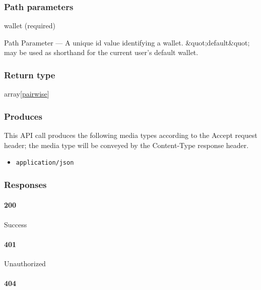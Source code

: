 \hypertarget{path-parameters-70}{%
\subsubsection{Path parameters}\label{path-parameters-70}}

wallet (required)

{Path Parameter} --- A unique id value identifying a wallet.
\&quot;default\&quot; may be used as shorthand for the current user's
default wallet.

\hypertarget{return-type-102}{%
\subsubsection{Return type}\label{return-type-102}}

array{[}\protect\hyperlink{pairwise}{pairwise}{]}

\hypertarget{produces-131}{%
\subsubsection{Produces}\label{produces-131}}

This API call produces the following media types according to the
{Accept} request header; the media type will be conveyed by the
{Content-Type} response header.

\begin{itemize}
\tightlist
\item
  \texttt{application/json}
\end{itemize}

\hypertarget{responses-134}{%
\subsubsection{Responses}\label{responses-134}}

\hypertarget{section-438}{%
\paragraph{200}\label{section-438}}

Success

\hypertarget{section-439}{%
\paragraph{401}\label{section-439}}

Unauthorized \protect\hyperlink{}{}

\hypertarget{section-440}{%
\paragraph{404}\label{section-440}}

